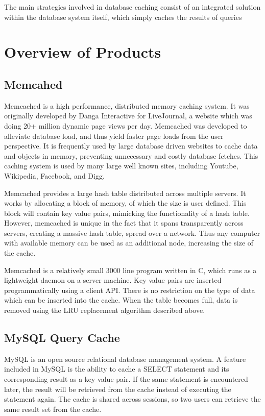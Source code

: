 \documentclass[ece]{uw-wkrpt}
\begin{document}


The main strategies involved in database caching consist of an integrated solution within the database system itself, which simply caches the results of queries 


\section{Overview of Products}
\subsection{Memcahed}
Memcached is a high performance, distributed memory caching system. It was originally developed by Danga Interactive for LiveJournal, a website which was doing 20+ million dynamic page views per day. Memcached was developed to alleviate database load, and thus yield faster page loads from the user perspective. It is frequently used by large database driven websites to cache data and objects in memory, preventing unnecessary and costly database fetches.  This caching system is used by many large well known sites, including Youtube, Wikipedia, Facebook, and Digg. 

Memcached provides a large hash table distributed across multiple servers. It works by allocating a block of memory, of which the size is user defined. This block will contain key value pairs, mimicking the functionality of a hash table. However, memcached is unique in the fact that it spans transparently across servers, creating a massive hash table, spread over a network. Thus any computer with available memory can be used as an additional node, increasing the size of the cache. 

Memcached is a relatively small 3000 line program written in C, which runs as a lightweight daemon on a server machine. Key value pairs are inserted programmatically using a client API.  There is no restriction on the type of data which can be inserted into the cache. When the table becomes full, data is removed using the LRU replacement algorithm described above. 



\subsection{MySQL Query Cache}
MySQL is an open source relational database management system. A feature included in MySQL is the ability to cache a SELECT statement and its corresponding result as a key value pair. If the same statement is encountered later, the result will be retrieved from the cache instead of executing the statement again. The cache is shared across sessions, so two users can retrieve the same result set from the cache. 
\end{document}
